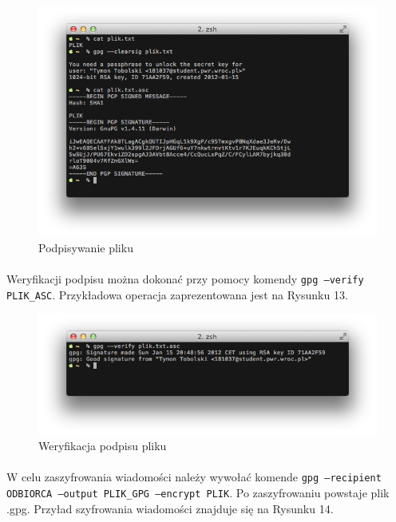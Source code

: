 \documentclass[wide,a4paper,titlepage,12pt] {article}
\begin{document}
  \begin{figure}[h!]
    \begin{center}
      \includegraphics[width=\textwidth]{img/12.png}
      \caption{Podpisywanie pliku}
    \end{center}
  \end{figure}

  \paragraph{}
  Weryfikacji podpisu można dokonać przy pomocy komendy \texttt{gpg --verify PLIK\_ASC}. Przykładowa operacja zaprezentowana jest na Rysunku 13.

  \begin{figure}[h!]
    \begin{center}
      \includegraphics[width=\textwidth]{img/13.png}
      \caption{Weryfikacja podpisu pliku}
    \end{center}
  \end{figure}

  \newpage
  \paragraph{}
  W celu zaszyfrowania wiadomości należy wywołać komende \texttt{gpg --recipient ODBIORCA --output PLIK\_GPG --encrypt PLIK}. Po zaszyfrowaniu powstaje plik .gpg. Przyład szyfrowania wiadomości znajduje się na Rysunku 14.
\end{document}
